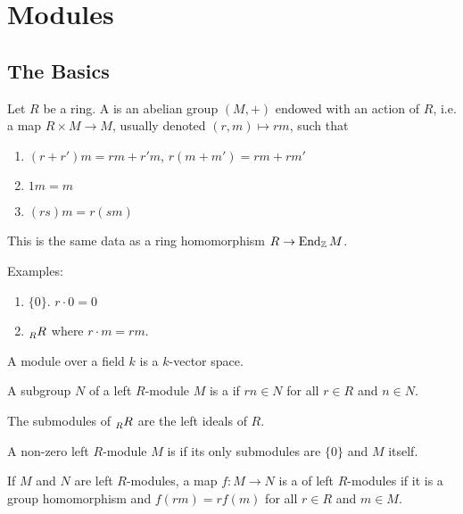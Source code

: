 \chapter{Modules}

\section{The Basics}

  \begin{define}
    Let $R$ be a ring. A  is an abelian group
    $(M,+)$ endowed with an action of $R$, i.e. a map $R\times M \to M$,
    usually denoted $(r,m)\mapsto rm$, such that
    \begin{enumerate}
      \item $(r + r')m = rm+r'm$, $r(m+m') = rm+rm'$
      \item $1m = m$
      \item $(rs)m = r(sm)$
    \end{enumerate}
  \end{define}
  This is the same data as a ring homomorphism $R \to \operatorname{End}_{\mathbb{Z}} M$.

  Examples:
  \begin{enumerate}
    \item $\{0\}$. $r\cdot 0 = 0$
    \item $\prescript{}{R}{R}$ where $r\cdot m = rm$.
  \end{enumerate}

  \begin{prop}
    A module over a field $k$ is a $k$-vector space.
  \end{prop}

  \begin{define}
    A subgroup $N$ of a left $R$-module $M$ is a  if $rn\in N$
    for all $r\in R$ and $n\in N$.
  \end{define}

  The submodules of $\prescript{}{R}{R}$ are the left ideals of $R$.

  \begin{define}
    A non-zero left $R$-module $M$ is  if its only submodules are
    $\{0\}$ and $M$ itself.
  \end{define}

  \begin{define}
    If $M$ and $N$ are left $R$-modules, a map $f:M\to N$ is a
     of left $R$-modules if it is a group homomorphism
    and $f(rm) = rf(m)$ for all $r\in R$ and $m\in M$.
  \end{define}

